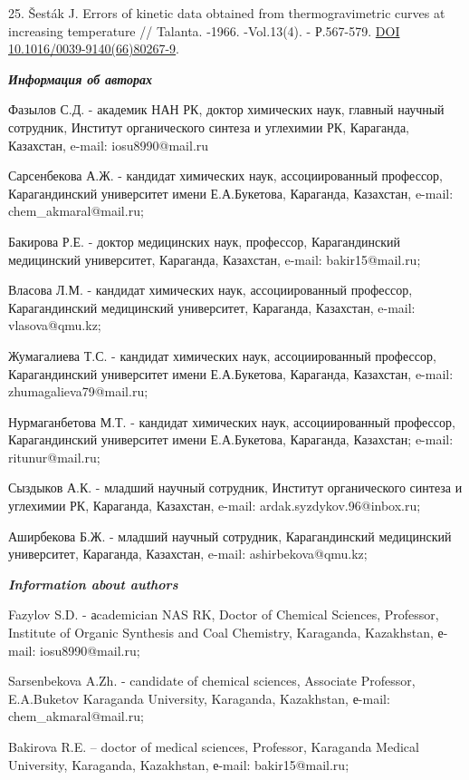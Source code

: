 25. Šesták J. Errors of kinetic data obtained from thermogravimetric
curves at increasing temperature // Talanta. -1966. -Vol.13(4).
- Р.567-579. \href{https://doi.org/10.1016/0039-9140(66)80267-9}{DOI
10.1016/0039-9140(66)80267-9}.

\emph{{\bfseries Информация об авторах}}

Фазылов С.Д. - академик НАН РК, доктор химических наук, главный научный
сотрудник, Институт органического синтеза и углехимии РК, Караганда,
Казахстан, e-mail:
iosu8990@mail.ru

Сарсенбекова А.Ж. - кандидат химических наук, ассоциированный профессор,
Карагандинский университет имени Е.А.Букетова, Караганда, Казахстан,
e-mail:
chem_akmaral@mail.ru;

Бакирова Р.Е. - доктор медицинских наук, профессор, Карагандинский
медицинский университет, Караганда, Казахстан, e-mail:
bakir15@mail.ru;

Власова Л.М. - кандидат химических наук, ассоциированный профессор,
Карагандинский медицинский университет, Караганда, Казахстан, e-mail:
vlasova@qmu.kz;

Жумагалиева Т.С. - кандидат химических наук, ассоциированный профессор,
Карагандинский университет имени Е.А.Букетова, Караганда, Казахстан,
e-mail: zhumagalieva79@mail.ru;

Нурмаганбетова М.Т. - кандидат химических наук, ассоциированный
профессор, Карагандинский университет имени Е.А.Букетова, Караганда,
Казахстан; e-mail:
ritunur@mail.ru;

Сыздыков А.К. - младший научный сотрудник, Институт органического
синтеза и углехимии РК, Караганда, Казахстан, e-mail:
ardak.syzdykov.96@inbox.ru;

Аширбекова Б.Ж. - младший научный сотрудник, Карагандинский медицинский
университет, Караганда, Казахстан, e-mail:
ashirbekova@qmu.kz;

\emph{{\bfseries Information about authors}}

Fazylov S.D. - аcademician NAS RK, Doctor of Chemical Sciences,
Professor, Institute of Organic Synthesis and Coal Chemistry, Karaganda,
Kazakhstan, е-mail:
iosu8990@mail.ru;

Sarsenbekova A.Zh. - candidate of chemical sciences, Associate
Professor, E.A.Buketov Karaganda University, Karaganda, Kazakhstan,
е-mail:
chem_akmaral@mail.ru;

Bakirova R.E. -- doctor of medical sciences, Professor, Karaganda
Medical University, Karaganda, Kazakhstan, е-mail:
bakir15@mail.ru;


